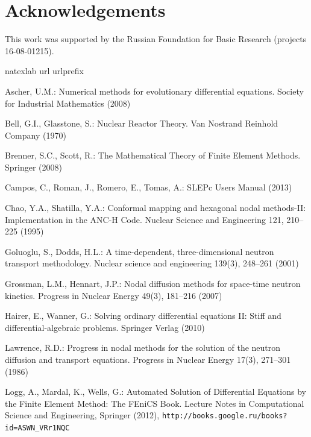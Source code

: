 \documentclass{llncs}
\begin{document}
\section*{Acknowledgements}
This work was supported by the Russian Foundation for Basic Research  (projects 16-08-01215).

\begin{thebibliography}{35}
\expandafter\ifx\csname natexlab\endcsname\relax\def\natexlab#1{#1}\fi
\expandafter\ifx\csname url\endcsname\relax
  \def\url#1{\texttt{#1}}\fi
\expandafter\ifx\csname urlprefix\endcsname\relax\def\urlprefix{URL }\fi


Ascher, U.M.: Numerical methods for evolutionary differential equations.
  Society for Industrial Mathematics (2008)

Bell, G.I., Glasstone, S.: Nuclear Reactor Theory. Van Nostrand Reinhold
  Company (1970)

Brenner, S.C., Scott, R.: The Mathematical Theory of Finite Element Methods.
  Springer (2008)

Campos, C., Roman, J., Romero, E., Tomas, A.: SLEPc Users Manual (2013)

Chao, Y.A., Shatilla, Y.A.: {Conformal mapping and hexagonal nodal methods-II:
  Implementation in the ANC-H Code}. Nuclear Science and Engineering  121,
  210--225 (1995)

Goluoglu, S., Dodds, H.L.: A time-dependent, three-dimensional neutron
  transport methodology. Nuclear science and engineering  139(3),  248--261
  (2001)

Grossman, L.M., Hennart, J.P.: Nodal diffusion methods for space-time neutron
  kinetics. Progress in Nuclear Energy  49(3),  181--216 (2007)

Hairer, E., Wanner, G.: {Solving ordinary differential equations II: Stiff and
  differential-algebraic problems}. Springer Verlag (2010)

Lawrence, R.D.: Progress in nodal methods for the solution of the neutron
  diffusion and transport equations. Progress in Nuclear Energy  17(3),
  271--301 (1986)

Logg, A., Mardal, K., Wells, G.: Automated Solution of Differential Equations
  by the Finite Element Method: The FEniCS Book. Lecture Notes in Computational
  Science and Engineering, Springer (2012),
  \url{http://books.google.ru/books?id=ASWN\_VRr1NQC}


\end{thebibliography}
\end{document}
